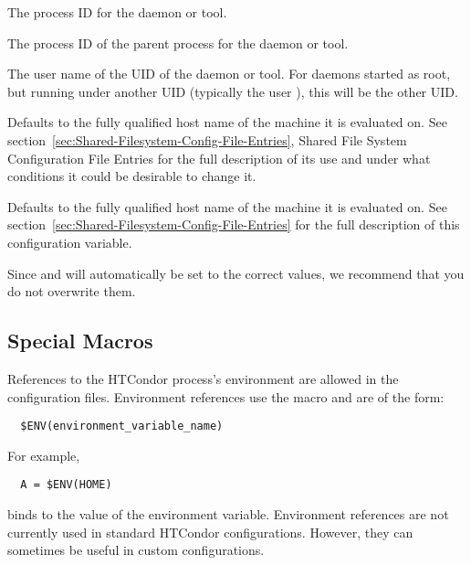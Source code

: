 \begin{description}
\label{param:Pid}
\item[\MacroU{PID}]
  The process ID for the daemon or tool.

\label{param:Ppid}
\item[\MacroU{PPID}]
  The process ID of the parent process for the daemon or tool.

\label{param:Username}
\item[\MacroU{USERNAME}]
  The user name of the UID of the daemon or tool.
  For daemons started as root, but running under another UID
  (typically the user ), this will be the other UID.

\label{param:FilesystemDomain}
\item[\MacroU{FILESYSTEM\_DOMAIN}]
  Defaults to the fully
  qualified host name of the machine it is evaluated on.  See
  section~\ref{sec:Shared-Filesystem-Config-File-Entries}, Shared
  File System Configuration File Entries for the full description of
  its use and under what conditions it could be desirable to change it.

\label{param:UIDDomain}
\item[\MacroU{UID\_DOMAIN}]
  Defaults to the fully
  qualified host name of the machine it is evaluated on.  See
  section~\ref{sec:Shared-Filesystem-Config-File-Entries} 
  for the full description of this configuration variable.

\end{description}

Since  and  will automatically be set to the
correct values, we recommend that you do not overwrite them.


\subsection{\label{sec:Config-File-Special}Special Macros}

References to the HTCondor process's environment are allowed in the
configuration files.
Environment references use the  macro and are of the form:
\begin{verbatim}
  $ENV(environment_variable_name)
\end{verbatim}
For example, 
\begin{verbatim}
  A = $ENV(HOME)
\end{verbatim}
binds  to the value of the  environment variable.
Environment references are not currently used in standard HTCondor
configurations.
However, they can sometimes be useful in custom configurations.

